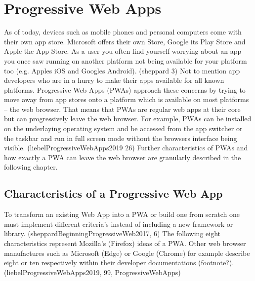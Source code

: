 \section{Progressive Web Apps}
\label{sec:theorieC}


As of today, devices such as mobile phones and personal computers come with their own app store. Microsoft offers their own Store, Google its Play Store and Apple the App Store. As a user you often find yourself worrying about an app you once saw running on another platform not being available for your platform too (e.g. Apples iOS and Googles Android). (sheppard 3) Not to mention app developers who are in a hurry to make their apps available for all known platforms.
\newline
Progressive Web Apps (PWAs) approach these concerns by trying to move away from app stores onto a platform which is available on most platforms – the web browser. That means that PWAs are regular web apps at their core but can progressively leave the web browser. For example, PWAs can be installed on the underlaying operating system and be accessed from the app switcher or the taskbar and run in full screen mode without the browsers interface being visible. (liebelProgressiveWebApps2019 26) Further characteristics of PWAs and how exactly a PWA can leave the web browser are granularly described in the following chapter.


\subsection{Characteristics of a Progressive Web App}
\label{sec:theorieCa}


To transform an existing Web App into a PWA or build one from scratch one must implement different criteria’s instead of including a new framework or library.  (sheppardBeginningProgressiveWeb2017, 6) 
The following eight characteristics represent Mozilla’s (Firefox) ideas of a PWA. Other web browser manufactures such as Microsoft (Edge) or Google (Chrome) for example describe eight or ten respectively within their developer documentations (footnote?). (liebelProgressiveWebApps2019, 99, ProgressiveWebApps)

